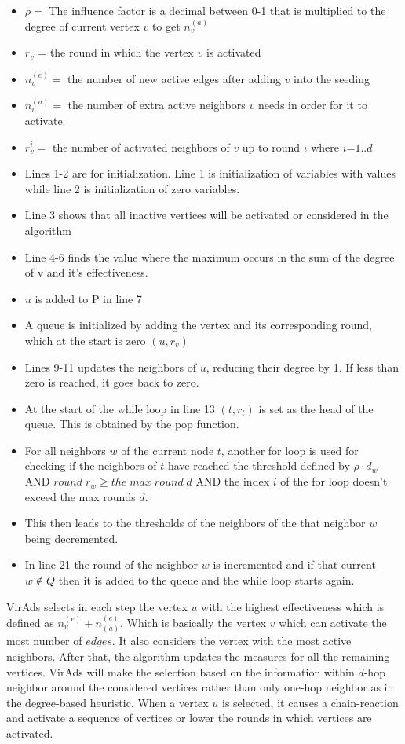 \begin{itemize}
	\item $\rho =$ The influence factor is a decimal between 0-1 that is multiplied to the degree of current vertex $v$ to get $n_{v}^{(a)}$
	\item $r_{v}$ = the round in which the vertex $v$ is activated
	\item $n_{v}^{(e)}=$ the number of new active edges after adding $v$ into the seeding
	\item $n_{v}^{(a)}=$ the number of extra active neighbors $v$ needs in order for it to activate.
	\item $r_{v}^{i}=$ the number of activated neighbors of $v$ up to round $i$ where $i$=$1..d$
	\item Lines 1-2 are for initialization. Line 1 is initialization of variables with values while line 2 is initialization of zero variables.
	\item Line 3 shows that all inactive vertices will be activated or considered in the algorithm
	\item Line 4-6 finds the value where the maximum occurs in the sum of the degree of v and it's effectiveness.
	\item $u$ is added to P in line 7
	\item A queue is initialized by adding the vertex and its corresponding round, which at the start is zero $(u,r_{v})$
	\item Lines 9-11 updates the neighbors of $u$, reducing their degree by 1. If less than zero is reached, it goes back to zero.
	\item At the start of the while loop in line 13 $(t,r_{t})$ is set as the head of the queue. This is obtained by the pop function. 
	\item For all neighbors $w$ of the current node $t$, another for loop is used for checking if the neighbors of $t$ have reached the threshold defined by $\rho \cdot d_{w}$ AND $round \; r_{w} \geq the\; max\; round\; d$ AND the index $i$ of the for loop doesn't exceed the max rounds $d$.
	\item This then leads to the thresholds of the neighbors of the that neighbor $w$ being decremented.
	\item In line 21 the round of the neighbor $w$ is incremented and if that current $w \notin Q$ then it is added to the queue and the while loop starts again.
\end{itemize}
VirAds selects in each step the vertex $u$ with the highest effectiveness which is defined as $n^{(e)}_{u}+n^{(e)}_{(a)}$. Which is basically the vertex $v$ which can activate the most number of $edges$. It also considers the vertex with the most active neighbors. After that, the algorithm updates the measures for all the remaining vertices. VirAds will make the selection based on the information within $d$-hop neighbor around the considered vertices rather than only one-hop neighbor as in the degree-based heuristic. When a vertex $u$ is selected, it causes a chain-reaction and activate a sequence of vertices or lower the rounds in which vertices are activated.\cite{virads}

